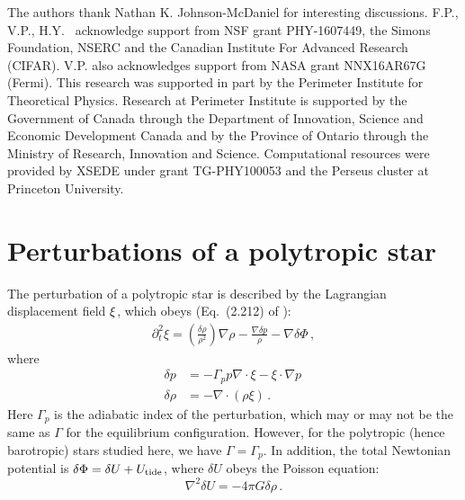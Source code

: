 \documentclass[prd,aps,floatfix,superscriptaddress,nofootinbib,twocolumn,10pt,English]{revtex4}
\begin{document}
\acknowledgments %
The authors thank Nathan K. Johnson-McDaniel for interesting discussions.  F.P., V.P.,
H.Y. ~acknowledge support from NSF grant PHY-1607449, the Simons
Foundation, NSERC and the Canadian Institute For Advanced Research (CIFAR). 
V.P. also acknowledges support from NASA grant
NNX16AR67G (Fermi). This research was supported in part by the Perimeter
Institute for Theoretical Physics. Research at Perimeter Institute is
supported by the Government of Canada through the Department of
Innovation, Science and Economic Development Canada and by the
Province of Ontario through the Ministry of Research, Innovation and
Science.  Computational resources were provided by XSEDE under grant
TG-PHY100053 and the Perseus cluster at Princeton University.


  
\appendix
\section{Perturbations of a polytropic star}\label{appendixA}

The perturbation of a polytropic star is described by the Lagrangian displacement field ${\bf \xi}$, which obeys (Eq.~(2.212) of \cite{poisson2014gravity}):
\begin{align}\label{eqeomp}
\partial^2_t \xi =\left ( \frac{\delta \rho}{\rho^2}\right ) \nabla \rho -\frac{\nabla \delta p}{\rho} -\nabla \delta \Phi\,,
\end{align}
where
\begin{align}
\delta p & = - \Gamma_p p \nabla \cdot \xi -\xi \cdot \nabla p \,\nonumber\\
\delta \rho & = -\nabla \cdot (\rho \xi)\,.
\end{align}
Here $\Gamma_p$ is the adiabatic index of the perturbation, which may or may not be the same as $\Gamma$ for the equilibrium configuration. However, for the polytropic (hence barotropic) stars studied here, we have $\Gamma=\Gamma_p$.  In addition, the total Newtonian potential is $\delta \Phi =\delta U + U_{\rm tide}$, where $\delta U$ obeys the Poisson equation:
\begin{equation}\label{eqpoi}
\nabla^2 \delta U = -4 \pi G \delta \rho\,.
\end{equation}
\end{document}
